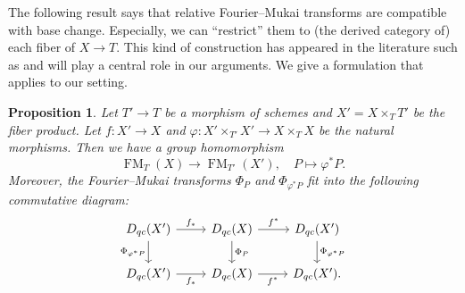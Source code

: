 \documentclass{amsart}
\numberwithin{equation}{section}
\theoremstyle{plain}
\newtheorem{proposition}[theorem]{Proposition}
\theoremstyle{definition}
\DeclareMathOperator{\FM}{\mathrm{FM}}
\begin{document}
The following result says that relative Fourier--Mukai transforms are compatible with base change.
Especially, we can ``restrict'' them to (the derived category of) each fiber of $X \to T$.
This kind of construction has appeared in the literature such as \cite{MR2238172, MR2505443, MR2593258} and will play a central role in our arguments.
We give a formulation that applies to our setting.
\begin{proposition}\label{prop:restriction-to-fiber}
    Let $T' \to T$ be a morphism of schemes and $X' = X \times_T T'$ be the fiber product.
    Let $f \colon X' \to X$ and $\varphi \colon X' \times_{T'} X' \to X \times_T X$ be the natural morphisms.
    Then we have a group homomorphism
    \begin{equation}
        \FM_T(X) \to \FM_{T'}(X'), \quad P \mapsto \varphi^*P.
    \end{equation}
    Moreover, the Fourier--Mukai transforms $\Phi_P$ and $\Phi_{\varphi^*P}$ fit into the following commutative diagram:
    \begin{equation}\label{diagram:restriction-to-fiber}
        \begin{tikzcd}
            D_{qc}(X') \ar[r, "f_*"] \ar[d, "\Phi_{\varphi^*P}"'] & D_{qc}(X) \ar[r, "f^*"]\ar[d, "\Phi_P"] & D_{qc}(X') \ar[d,  "\Phi_{\varphi^*P}"]\\
            D_{qc}(X') \ar[r, "f_*"'] & D_{qc}(X) \ar[r, "f^*"'] & D_{qc}(X').
        \end{tikzcd}
    \end{equation}
\end{proposition}
\end{document}

